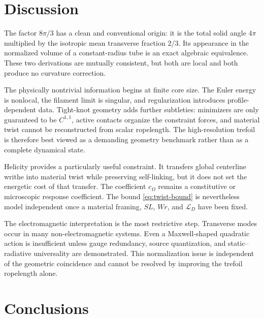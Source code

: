 \documentclass[aps,pre,preprint,notitlepage,nofootinbib,superscriptaddress]{revtex4-2}
\newcommand{\calL}{\mathcal L}
\begin{document}
\section{Discussion}
\label{sec:discussion}

The factor $8\pi/3$ has a clean and conventional origin: it is the total solid angle $4\pi$ multiplied by the isotropic mean transverse fraction $2/3$.  Its appearance in the normalized volume of a constant-radius tube is an exact algebraic equivalence.  These two derivations are mutually consistent, but both are local and both produce no curvature correction.

The physically nontrivial information begins at finite core size.  The Euler energy is nonlocal, the filament limit is singular, and regularization introduces profile-dependent data.  Tight-knot geometry adds further subtleties: minimizers are only guaranteed to be $C^{1,1}$, active contacts organize the constraint forces, and material twist cannot be reconstructed from scalar ropelength.  The high-resolution trefoil is therefore best viewed as a demanding geometry benchmark rather than as a complete dynamical state.

Helicity provides a particularly useful constraint.  It transfers global centerline writhe into material twist while preserving self-linking, but it does not set the energetic cost of that transfer.  The coefficient $c_\Omega$ remains a constitutive or microscopic response coefficient.  The bound \eqref{eq:twist-bound} is nevertheless model independent once a material framing, $SL$, $Wr$, and $\calL_D$ have been fixed.

The electromagnetic interpretation is the most restrictive step.  Transverse modes occur in many non-electromagnetic systems.  Even a Maxwell-shaped quadratic action is insufficient unless gauge redundancy, source quantization, and static--radiative universality are demonstrated.  This normalization issue is independent of the geometric coincidence and cannot be resolved by improving the trefoil ropelength alone.

\section{Conclusions}
\end{document}
